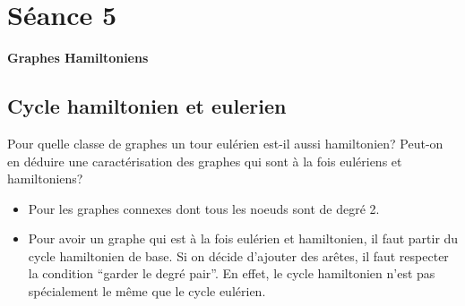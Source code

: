 \section{Séance 5}

\textbf{Graphes Hamiltoniens}

\subsection{Cycle hamiltonien et eulerien}
Pour quelle classe de graphes un tour eulérien est-il aussi hamiltonien? Peut-on en déduire une caractérisation des graphes qui sont à la fois eulériens et hamiltoniens?
\begin{solution}
\begin{itemize}
\item Pour les graphes connexes dont tous les noeuds sont de degré 2.
\item Pour avoir un graphe qui est à la fois eulérien et hamiltonien, il faut partir du cycle hamiltonien de base. Si on décide d'ajouter des arêtes, il faut respecter la condition ``garder le degré pair''. En effet, le cycle hamiltonien n'est pas spécialement le même que le cycle eulérien.
\end{itemize}
\end{solution}

